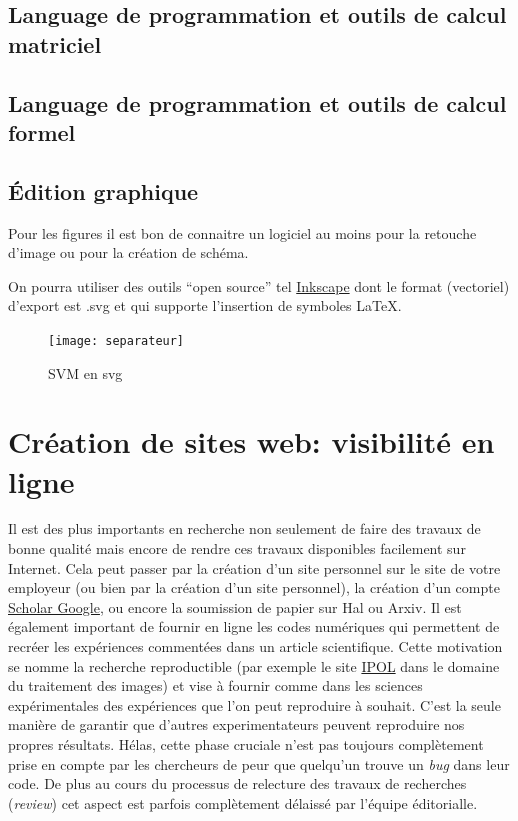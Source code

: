 \documentclass[a4paper,10pt]{article}
\begin{document}
\subsection{Language de programmation et outils de calcul matriciel}






\subsection{Language de programmation et outils de calcul formel}


\subsection{Édition graphique}
Pour les figures il est bon de connaitre un
logiciel au moins pour la retouche d'image ou pour la création de schéma.

On pourra utiliser des outils ``open source'' tel  \href{http://inkscape.org/}{Inkscape}
 dont le format (vectoriel)
d'export est .svg et qui supporte l'insertion de symboles \LaTeX. 

\begin{figure}[htb]
\center
\texttt{[image: separateur]}
\caption{SVM en svg}
\label{fig:smv}
\end{figure}




\section{Création de sites web: visibilité en ligne}
Il est des plus importants en recherche non seulement de faire des travaux de bonne qualité
mais encore de rendre ces travaux disponibles facilement sur Internet. Cela peut passer par la création
d'un site personnel sur le site de votre employeur (ou bien par la création d'un site personnel),
la création d'un compte \href{http://scholar.google.com}{Scholar Google}, ou encore la soumission de papier
sur Hal ou Arxiv.
Il est également important de fournir en ligne les codes numériques qui permettent de recréer les 
expériences commentées dans un article scientifique. Cette motivation se nomme 
la recherche reproductible (\lcf par exemple le site \href{http://www.ipol.im/}{IPOL} dans le domaine
du traitement des images)  et vise à fournir comme dans les sciences expérimentales des expériences 
que l'on peut reproduire à souhait. C'est la seule manière de garantir que d'autres experimentateurs
peuvent reproduire nos propres résultats. Hélas, cette phase cruciale n'est pas toujours complètement 
prise en compte par les chercheurs de peur que quelqu'un trouve un \textit{bug} dans leur code.
De plus au cours du processus de relecture des travaux de recherches (\textit{review}) cet
aspect est parfois complètement délaissé par l'équipe éditorialle.
\end{document}
